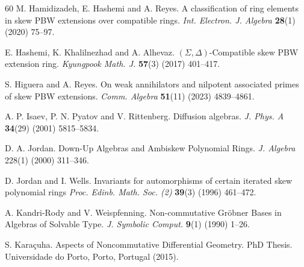 \documentclass{amsart}
\theoremstyle{definition}
\theoremstyle{remark}
\numberwithin{equation}{section}
\begin{document}
\begin{thebibliography}{60}
 M. Hamidizadeh, E. Hashemi and A. Reyes. A classification of ring elements in skew PBW extensions over compatible rings. {\em Int. Electron. J. Algebra} {\bf 28}(1) (2020) 75--97.

 E. Hashemi, K. Khalilnezhad and A. Alhevaz. $(\Sigma, \Delta)$-Compatible skew PBW extension ring. {\em Kyungpook Math. J.} {\bf 57}(3) (2017) 401--417.

 S. Higuera and A. Reyes. On weak annihilators and nilpotent associated primes of skew PBW extensions. {\em Comm. Algebra} {\bf 51}(11) (2023) 4839--4861.


 A. P. Isaev, P. N. Pyatov and V. Rittenberg. Diffusion algebras. {\em J. Phys. A} {\bf 34}(29) (2001) 5815--5834.



 D. A. Jordan. Down-Up Algebras and Ambiskew Polynomial Rings. {\em J. Algebra} 228(1) (2000) 311--346.

 D. Jordan and I. Wells. Invariants for automorphisms of certain iterated skew polynomial rings {\em Proc. Edinb. Math. Soc. (2)} {\bf 39}(3) (1996) 461--472.



 A. Kandri-Rody and V. Weispfenning. Non-commutative Gr\"obner Bases in Algebras of Solvable Type. {\em J. Symbolic Comput.} {\bf 9}(1) (1990) 1--26.

 S. Kara\c cuha. Aspects of Noncommutative Differential Geometry. PhD Thesis. Universidade do Porto, Porto, Portugal (2015).


\end{thebibliography}
\end{document}
